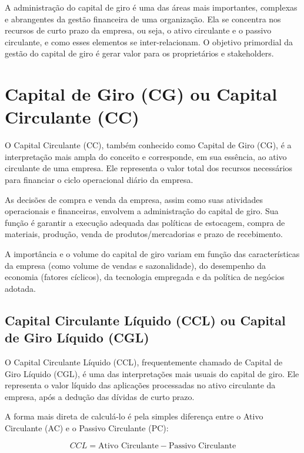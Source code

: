 \documentclass[
  a4paper,
]{book}
\begin{document}
A administração do capital de giro é uma das áreas mais importantes,
complexas e abrangentes da gestão financeira de uma organização. Ela se
concentra nos recursos de curto prazo da empresa, ou seja, o ativo
circulante e o passivo circulante, e como esses elementos se
inter-relacionam. O objetivo primordial da gestão do capital de giro é
gerar valor para os proprietários e stakeholders.

\section{Capital de Giro (CG) ou Capital Circulante
(CC)}\label{capital-de-giro-cg-ou-capital-circulante-cc}

O Capital Circulante (CC), também conhecido como Capital de Giro (CG), é
a interpretação mais ampla do conceito e corresponde, em sua essência,
ao ativo circulante de uma empresa. Ele representa o valor total dos
recursos necessários para financiar o ciclo operacional diário da
empresa.

As decisões de compra e venda da empresa, assim como suas atividades
operacionais e financeiras, envolvem a administração do capital de giro.
Sua função é garantir a execução adequada das políticas de estocagem,
compra de materiais, produção, venda de produtos/mercadorias e prazo de
recebimento.

A importância e o volume do capital de giro variam em função das
características da empresa (como volume de vendas e sazonalidade), do
desempenho da economia (fatores cíclicos), da tecnologia empregada e da
política de negócios adotada.

\subsection{Capital Circulante Líquido (CCL) ou Capital de Giro Líquido
(CGL)}\label{capital-circulante-luxedquido-ccl-ou-capital-de-giro-luxedquido-cgl}

O Capital Circulante Líquido (CCL), frequentemente chamado de Capital de
Giro Líquido (CGL), é uma das interpretações mais usuais do capital de
giro. Ele representa o valor líquido das aplicações processadas no ativo
circulante da empresa, após a dedução das dívidas de curto prazo.

A forma mais direta de calculá-lo é pela simples diferença entre o Ativo
Circulante (AC) e o Passivo Circulante (PC):

\[CCL = \text{Ativo Circulante} - \text{Passivo Circulante}\]
\end{document}
